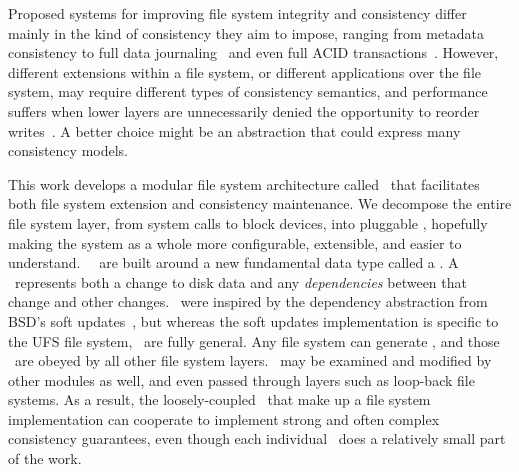 Proposed systems for improving file system integrity and consistency differ
 mainly in the kind of consistency they aim to impose, ranging from
 metadata consistency to full data journaling~\cite{tweedie98journaling} and even full ACID
 transactions~\cite{gal05transactional,liskov04transactional}.
%
However, different extensions within a file system, or different
 applications over the file system, may require different types of
 consistency semantics, and performance suffers when lower layers are
 unnecessarily denied the opportunity to reorder
 writes~\cite{ganger00soft}.
%
A better choice might be an abstraction that could express many consistency
 models.



This work develops a modular file system architecture called \Kudos\ that
 facilitates both file system extension and consistency
 maintenance.
%
We decompose the entire file system layer, from system calls to block
 devices, into pluggable \modules, hopefully making the system as a whole
 more configurable, extensible, and easier to understand.
%
\Kudos\ \modules\ are built around a new fundamental data type called a
 \emph{\chdesc}.
%
A \chdesc\ represents both a change to disk data and any
 \emph{dependencies} between that change and other changes.
%
\Chdescs\ were inspired by the dependency abstraction from BSD's
 soft updates~\cite{ganger00soft}, but whereas the soft updates implementation
 is specific to the UFS file system, \chdescs\ are fully general.
%
Any file system can generate \chdescs, and those \chdescs\
are obeyed by all other file system layers.
%
\Chdescs\ may be examined and modified by other modules
 as well, and even passed through layers such as loop-back file systems.
%
As a result, the loosely-coupled \modules\ that make up a file system
 implementation can cooperate to implement strong and often complex
 consistency guarantees, even though each individual \module\ does a
 relatively small part of the work.


